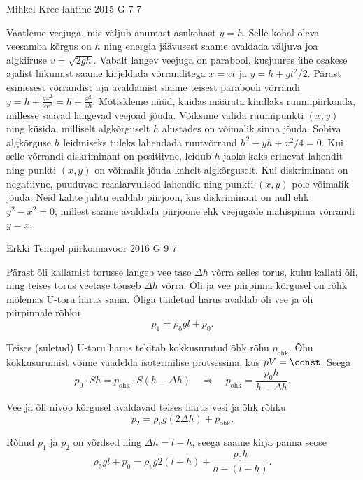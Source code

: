 \documentclass[11pt, twoside]{article}
\begin{document}
{%
{Mihkel Kree} %
{lahtine} %
{2015} %
{G 7} %
{7} %
{

\ifSolution
Vaatleme veejuga, mis väljub anumast asukohast $y=h$. Selle kohal oleva veesamba kõrgus on $h$ ning energia jäävusest saame avaldada väljuva joa algkiiruse $v=\sqrt{2gh}$. Vabalt langev veejuga on parabool, kusjuures ühe osakese ajalist liikumist saame kirjeldada võrranditega $x=vt$ ja $y=h+gt^2/2$. Pärast esimesest võrrandist aja avaldamist saame teisest parabooli võrrandi $y = h + \frac{gx^2}{2v^2} = h + \frac{x^2}{4h}$. Mõtiskleme nüüd, kuidas määrata kindlaks ruumipiirkonda, millesse saavad langevad veejoad jõuda. Võiksime valida ruumipunkti $(x,y)$ ning küsida, milliselt algkõrguselt $h$ alustades on võimalik sinna jõuda. Sobiva algkõrguse $h$ leidmiseks tuleks lahendada ruutvõrrand $h^2 - yh + x^2/4 = 0$. Kui selle võrrandi diskriminant on positiivne, leidub $h$ jaoks kaks erinevat lahendit ning punkti $(x,y)$ on võimalik jõuda kahelt algkõrguselt. Kui diskriminant on negatiivne, puuduvad reaalarvulised lahendid ning punkti $(x,y)$ pole võimalik jõuda. Neid kahte juhtu eraldab piirjoon, kus diskriminant on null ehk $y^2 - x^2=0$, millest saame avaldada piirjoone ehk veejugade mähispinna võrrandi $y=x$.
\fi
}

{Erkki Tempel} %
{piirkonnavoor} %
{2016} %
{G 9} %
{7} %
{

\ifSolution
Pärast õli kallamist torusse langeb vee tase $\Delta h$ võrra selles torus, kuhu kallati õli, ning teises torus veetase tõuseb $\Delta h$ võrra. Õli ja vee piirpinna kõrgusel on rõhk mõlemas U-toru harus sama. Õliga täidetud harus avaldab õli vee ja õli piirpinnale rõhku
\[ p_1 = \rho_{\text{õ}}gl + p_0.\]

Teises (suletud) U-toru harus tekitab kokkusurutud õhk rõhu $p_{\text{õhk}}$. Õhu kokkusurumist võime vaadelda isotermilise protsessina, kus $pV = \const$. Seega
\[ p_0\cdot Sh = p_{\text{õhk}}\cdot S(h-\Delta h) \quad\Rightarrow\quad p_{\text{õhk}} = \frac{p_0h}{h-\Delta h}.\]

Vee ja õli nivoo kõrgusel avaldavad teises harus vesi ja õhk rõhku
\[ p_2 = \rho_vg(2\Delta h) + p_{\text{õhk}}.\]

Rõhud $p_1$ ja $p_2$ on võrdsed ning $\Delta h = l - h$, seega saame kirja panna seose
\[ \rho_{\text{õ}}gl + p_0 = \rho_vg2(l-h) + \frac{p_0h}{h-(l-h)}.\]

}}
\end{document}
